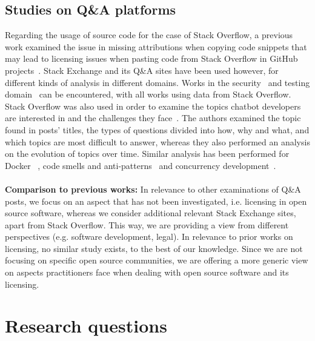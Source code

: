 \documentclass{elsarticle}
\begin{document}
\subsection{Studies on Q\&A platforms}

Regarding the usage of source code for the case of Stack Overflow, a previous work examined the issue in missing attributions when copying code snippets that may lead to licensing issues when pasting code from Stack Overflow in GitHub projects~\cite{baltes2019usage}. Stack Exchange and its Q\&A sites have been used however, for different kinds of analysis in different domains. Works in the security~\cite{yang2016security,lopez2019anatomy} and testing domain~\cite{kochhar2016mining} can be encountered, with all works using data from Stack Overflow. Stack Overflow was also used in order to examine the topics chatbot developers are interested in and the challenges they face~\cite{abdellatif2020challenges}. The authors examined the topic found in posts' titles, the types of questions divided into how, why and what, and which topics are most difficult to answer, whereas they also performed an analysis on the evolution of topics over time. Similar analysis has been performed for Docker%
~\cite{haque2020challenges}, code smells and anti-patterns~\cite{tahir2018can} and concurrency development~\cite{ahmed2018concurrency}.
\\
\\
\textbf{Comparison to previous works:} In relevance to other examinations of Q\&A posts, we focus on an aspect that has not been investigated, i.e. licensing in open source software, whereas we consider additional relevant Stack Exchange sites, apart from Stack Overflow. This way, we are providing a view from different perspectives (e.g. software development, legal). In relevance to prior works on licensing, no similar study exists, to the best of our knowledge. Since we are not focusing on specific open source communities, we are offering a more generic view on aspects practitioners face when dealing with open source software and its licensing.

\section{Research questions}
\label{rqs}
\end{document}
